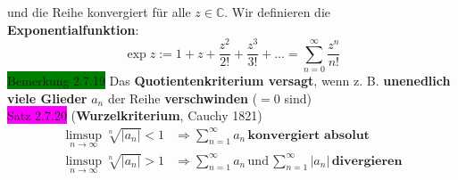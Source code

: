 \documentclass[landscape, 10pt]{article}
\newcommand{\R}{\mathbb{R}}
\newcommand{\C}{\mathbb{C}}
\begin{document}
\begin{multicols}{3}
                     und die Reihe konvergiert 
                     für alle \textcolor{NavyBlue}{$z\in\C$}.
                     Wir definieren die \textbf{Exponentialfunktion}: 
                     \begin{equation*}
                            \exp z:=1+z+\frac{z^2}{2!}+\frac{z^3}{3!}+\dots
                            =\sum_{n=0}^\infty\frac{z^n}{n!}
                     \end{equation*}
              \colorbox{green}{Bemerkung 2.7.19} 
                     Das \textbf{Quotientenkriterium versagt}, wenn z. B. 
                     \textbf{unenedlich viele Glieder} 
                     \textcolor{NavyBlue}{$a_n$} der Reihe 
                     \textbf{verschwinden} ($=0$ sind)\\
              \colorbox{magenta}{Satz 2.7.20}
              (\textbf{Wurzelkriterium}, Cauchy 1821)\\
                     \begin{align*}
                            \limsup\limits_{n\to\infty}
                            \sqrt[n]{|a_n|}<1
                            &\Longrightarrow
                            \sum_{n=1}^\infty a_n \,
                            \textbf{konvergiert absolut}\\
                            \limsup\limits_{n\to\infty}
                            \sqrt[n]{|a_n|}>1
                            &\Longrightarrow
                            \sum_{n=1}^\infty a_n \, 
                            \text{und} \,
                            \sum_{n=1}^\infty |a_n| \,
                            \textbf{divergieren}
                     \end{align*}

\end{multicols}
\end{document}
